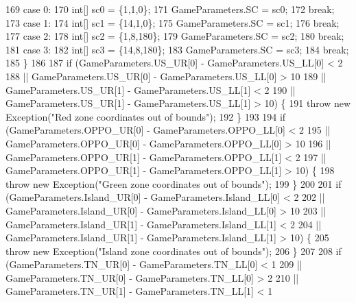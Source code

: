 \begin{DoxyCode}
169           \textcolor{keywordflow}{case} 0:
170             \textcolor{keywordtype}{int}[] sc0 = \{1,1,0\};
171             GameParameters.SC = sc0;
172             \textcolor{keywordflow}{break};
173           \textcolor{keywordflow}{case} 1:
174             \textcolor{keywordtype}{int}[] sc1 = \{14,1,0\};
175             GameParameters.SC = sc1;
176             \textcolor{keywordflow}{break};
177           \textcolor{keywordflow}{case} 2:
178             \textcolor{keywordtype}{int}[] sc2 = \{1,8,180\};
179             GameParameters.SC = sc2;
180             \textcolor{keywordflow}{break};
181           \textcolor{keywordflow}{case} 3:
182             \textcolor{keywordtype}{int}[] sc3 = \{14,8,180\};
183             GameParameters.SC = sc3;
184             \textcolor{keywordflow}{break};
185         \}
186         
187         \textcolor{keywordflow}{if} (GameParameters.US\_UR[0] - GameParameters.US\_LL[0] < 2
188             || GameParameters.US\_UR[0] - GameParameters.US\_LL[0] > 10
189             || GameParameters.US\_UR[1] - GameParameters.US\_LL[1] < 2
190             || GameParameters.US\_UR[1] - GameParameters.US\_LL[1] > 10) \{
191           \textcolor{keywordflow}{throw} \textcolor{keyword}{new} Exception(\textcolor{stringliteral}{"Red zone coordinates out of bounds"});
192         \}
193 
194         \textcolor{keywordflow}{if} (GameParameters.OPPO\_UR[0] - GameParameters.OPPO\_LL[0] < 2
195             || GameParameters.OPPO\_UR[0] - GameParameters.OPPO\_LL[0] > 10
196             || GameParameters.OPPO\_UR[1] - GameParameters.OPPO\_LL[1] < 2
197             || GameParameters.OPPO\_UR[1] - GameParameters.OPPO\_LL[1] > 10) \{
198           \textcolor{keywordflow}{throw} \textcolor{keyword}{new} Exception(\textcolor{stringliteral}{"Green zone coordinates out of bounds"});
199         \}
200 
201         \textcolor{keywordflow}{if} (GameParameters.Island\_UR[0] - GameParameters.Island\_LL[0] < 2
202             || GameParameters.Island\_UR[0] - GameParameters.Island\_LL[0] > 10
203             || GameParameters.Island\_UR[1] - GameParameters.Island\_LL[1] < 2
204             || GameParameters.Island\_UR[1] - GameParameters.Island\_LL[1] > 10) \{
205           \textcolor{keywordflow}{throw} \textcolor{keyword}{new} Exception(\textcolor{stringliteral}{"Island zone coordinates out of bounds"});
206         \}
207 
208         \textcolor{keywordflow}{if} (GameParameters.TN\_UR[0] - GameParameters.TN\_LL[0] < 1
209             || GameParameters.TN\_UR[0] - GameParameters.TN\_LL[0] > 2
210             || GameParameters.TN\_UR[1] - GameParameters.TN\_LL[1] < 1

\end{DoxyCode}
